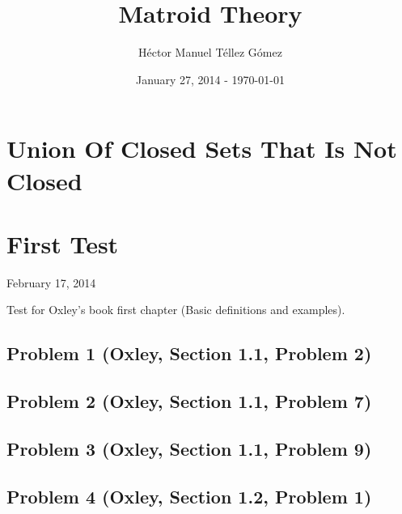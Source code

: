 \frontmatter
\title{Matroid Theory}
\author{Héctor Manuel Téllez Gómez}
\date{January 27, 2014 - \today}
\maketitle

\tableofcontents

\mainmatter


\chapter{Union Of Closed Sets That Is Not Closed}


\chapter{First Test}
    \begin{center} February 17, 2014 \end{center}
    Test for Oxley's book first chapter (Basic definitions and examples). 
    
    \section{Problem 1 (Oxley, Section 1.1, Problem 2)}
        
    
    \section{Problem 2 (Oxley, Section 1.1, Problem 7)}    
        

    \section{Problem 3 (Oxley, Section 1.1, Problem 9)}    
            
        
    \section{Problem 4 (Oxley, Section 1.2, Problem 1)}    
        